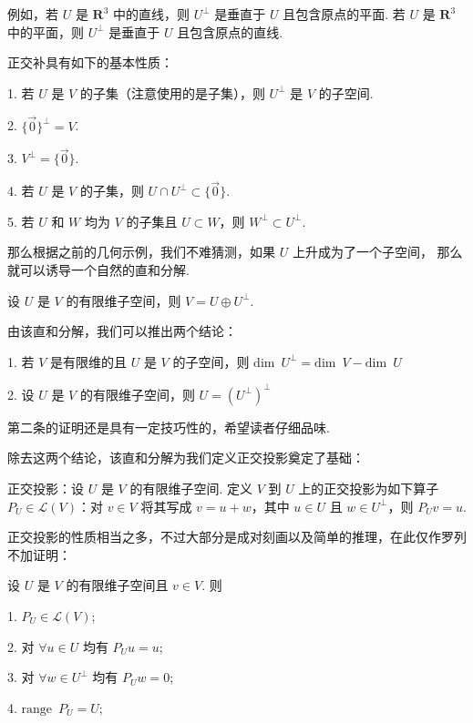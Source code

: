 例如，若 $ U $ 是 $ \mathbf{R}^{3} $ 中的直线，则 $ U^{\perp } $ 是垂直于 $ U $ 且包含原点的平面. 
若 $ U $ 是 $ \mathbf{R}^{3} $ 中的平面，则 $ U^{\perp } $ 是垂直于 $ U $ 且包含原点的直线. 

正交补具有如下的基本性质：

1. 若 $ U $ 是 $ V $ 的子集（注意使用的是子集），则 $ U^{\perp }$ 是 $ V $ 的子空间. 

2. $ \{ \vec{0} \}^{\perp } = V $. 

3. $ V^{\perp } = \{ \vec{0} \} $. 

4. 若 $ U $ 是 $ V $ 的子集，则 $ U \cap U^{\perp } \subset \{ \vec{0} \}$. 

5. 若 $ U $ 和 $ W $ 均为 $ V $ 的子集且 $ U \subset W $，则 $ W^{\perp } \subset U^{\perp }$. 

那么根据之前的几何示例，我们不难猜测，如果 $ U $ 上升成为了一个子空间，
那么就可以诱导一个自然的直和分解. 

\begin{theorem}
    设 $ U $ 是 $ V $ 的有限维子空间，则 $ V = U \oplus U^{\perp } $.  
\end{theorem}

由该直和分解，我们可以推出两个结论：

1. 若 $ V $ 是有限维的且 $ U $ 是 $ V $ 的子空间，则 
$ \mathrm{dim} \enspace U^{\perp }= \mathrm{dim} \enspace V - \mathrm{dim} \enspace U$

2. 设 $ U $ 是 $ V $ 的有限维子空间，则 $ U = (U^{\perp})^{\perp} $

第二条的证明还是具有一定技巧性的，希望读者仔细品味. 

除去这两个结论，该直和分解为我们定义正交投影奠定了基础：
\begin{definition}
    正交投影：设 $ U $ 是 $ V $ 的有限维子空间. 定义 $ V $ 到 $ U $ 上的正交投影为如下算子
    $ P_U \in \mathcal{L} (V)$：对 $ v \in V $ 将其写成 $ v = u + w $，其中 $ u \in U $
    且 $ w \in U^{\perp }$，则 $ P_U v = u $. 
\end{definition}

正交投影的性质相当之多，不过大部分是成对刻画以及简单的推理，在此仅作罗列不加证明：

设 $ U $ 是 $ V $ 的有限维子空间且 $ v \in V$. 则

1. $ P_U \in \mathcal{L} (V) $;

2. 对 $ \forall u \in U$ 均有 $ P_U u = u $;

3. 对 $ \forall w \in U^{\perp}$ 均有 $ P_U w = 0 $;

4. $ \mathrm{range} \enspace P_U = U$; 

